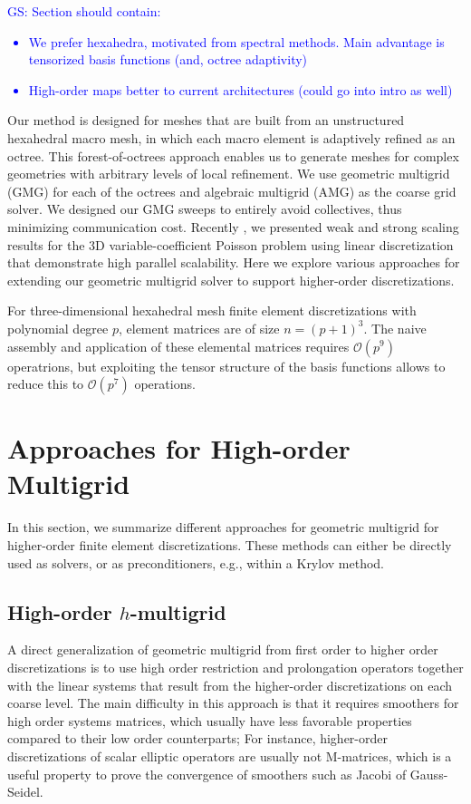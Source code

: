 \documentclass[times]{nlaauth}
\newcommand{\gsnote}[1]{\textcolor{blue}{GS: #1}}
\begin{document}
\gsnote{Section should contain:
\begin{itemize}
\item We prefer hexahedra, motivated from spectral methods. Main
  advantage is tensorized basis functions (and, octree adaptivity)
\item High-order maps better to current architectures (could go into
  intro as well)
\end{itemize}
}

Our method is designed for meshes that are built from an unstructured
hexahedral macro mesh, in which each macro element is adaptively
refined as an octree. This forest-of-octrees approach enables us to
generate meshes for complex geometries with arbitrary levels of local
refinement. We use geometric multigrid (GMG) for each of the octrees
and algebraic multigrid (AMG) as the coarse grid solver. We designed
our GMG sweeps to entirely avoid collectives, thus minimizing
communication cost. Recently \cite{SundarBirosBursteddeEtAl12}, we
presented weak and strong scaling results for the 3D
variable-coefficient Poisson problem using linear discretization that
demonstrate high parallel scalability. Here we explore various
approaches for extending our geometric multigrid solver to support
higher-order discretizations.

For three-dimensional hexahedral mesh finite element discretizations
with polynomial degree $p$, element matrices are of size
$n=(p+1)^3$. The naive assembly and application of these elemental
matrices requires $\mathcal O(p^9)$ operatrions, but exploiting the
tensor structure of the basis functions allows to reduce this to
$\mathcal O(p^7)$ operations.


\section{Approaches for High-order Multigrid}
\label{sec:approaches}

In this section, we summarize different approaches for geometric
multigrid for higher-order finite element discretizations. These
methods can either be directly used as solvers, or as preconditioners,
e.g., within a Krylov method.


\subsection{High-order $h$-multigrid}\label{subsec:h}
A direct generalization of geometric multigrid from first order to
higher order discretizations is to use high order restriction and
prolongation operators together with the linear systems that result
from the higher-order discretizations on each coarse level.  The main
difficulty in this approach is that it requires smoothers for high
order systems matrices, which usually have less favorable properties
compared to their low order counterparts; For instance, higher-order
discretizations of scalar elliptic operators are usually not
M-matrices, which is a useful property to prove the convergence of
smoothers such as Jacobi of Gauss-Seidel.
\end{document}
